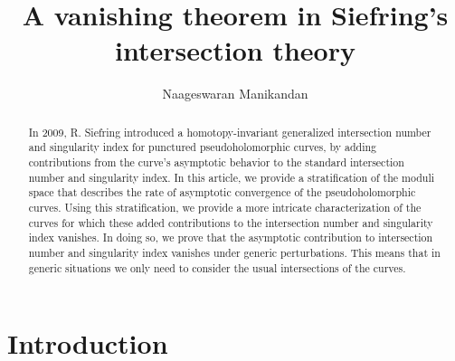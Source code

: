 \documentclass[11pt, a4paper]{amsart}
\begin{document}


\title{A vanishing theorem in Siefring's intersection theory}
\author[N\, Manikandan]{Naageswaran Manikandan}
\address{Max Planck Institute for Mathematics in Bonn}




\date{} %



\begin{abstract}
In 2009, R. Siefring introduced a homotopy-invariant generalized intersection number and singularity index for punctured pseudoholomorphic curves, by adding contributions from the curve's asymptotic behavior to the standard intersection number and singularity index.
In this article, we provide a stratification of the moduli space that describes the rate of asymptotic convergence of the pseudoholomorphic curves. 
Using this stratification, we provide a more intricate characterization of the curves for which these added contributions to the intersection number and singularity index vanishes. In doing so, we prove that the asymptotic contribution to intersection number and singularity index vanishes under generic perturbations. This means that in generic situations we only need to consider the usual intersections of the curves.
\end{abstract}



\makeatletter
{}
\makeatother%



\maketitle

\section{Introduction}
\end{document}
